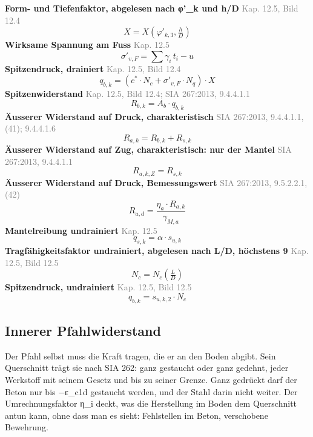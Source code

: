 \documentclass[11pt,a4paper]{article}
\newcommand{\normref}[1]{{\small\textcolor{gray}{#1}}}
\begin{document}
\noindent\textbf{Form- und Tiefenfaktor, abgelesen nach φ'\_k und h/D} \hfill \normref{Kap. 12.5, Bild 12.4}
\begin{equation*}
X = X\left(\varphi'_{k,3}, \tfrac{h}{D}\right)
\end{equation*}
\noindent\textbf{Wirksame Spannung am Fuss} \hfill \normref{Kap. 12.5}
\begin{equation*}
\sigma'_{v,F} = \sum \gamma_i \, t_i - u
\end{equation*}
\noindent\textbf{Spitzendruck, drainiert} \hfill \normref{Kap. 12.5, Bild 12.4}
\begin{equation*}
q_{b,k} = \left(c^{*} \cdot N_c + \sigma'_{v,F} \cdot N_q\right) \cdot X
\end{equation*}
\noindent\textbf{Spitzenwiderstand} \hfill \normref{Kap. 12.5, Bild 12.4; SIA 267:2013, 9.4.4.1.1}
\begin{equation*}
R_{b,k} = A_b \cdot q_{b,k}
\end{equation*}
\noindent\textbf{Äusserer Widerstand auf Druck, charakteristisch} \hfill \normref{SIA 267:2013, 9.4.4.1.1, (41); 9.4.4.1.6}
\begin{equation*}
R_{a,k} = R_{b,k} + R_{s,k}
\end{equation*}
\noindent\textbf{Äusserer Widerstand auf Zug, charakteristisch: nur der Mantel} \hfill \normref{SIA 267:2013, 9.4.4.1.1}
\begin{equation*}
R_{a,k,Z} = R_{s,k}
\end{equation*}
\noindent\textbf{Äusserer Widerstand auf Druck, Bemessungswert} \hfill \normref{SIA 267:2013, 9.5.2.2.1, (42)}
\begin{equation*}
R_{a,d} = \frac{\eta_a \cdot R_{a,k}}{\gamma_{M,a}}
\end{equation*}
\noindent\textbf{Mantelreibung undrainiert} \hfill \normref{Kap. 12.5}
\begin{equation*}
q_{s,k} = \alpha \cdot s_{u,k}
\end{equation*}
\noindent\textbf{Tragfähigkeitsfaktor undrainiert, abgelesen nach L/D, höchstens 9} \hfill \normref{Kap. 12.5, Bild 12.5}
\begin{equation*}
N_c = N_c\left(\tfrac{L}{D}\right)
\end{equation*}
\noindent\textbf{Spitzendruck, undrainiert} \hfill \normref{Kap. 12.5, Bild 12.5}
\begin{equation*}
q_{b,k} = s_{u,k,2} \cdot N_c
\end{equation*}
\subsection{Innerer Pfahlwiderstand}
Der Pfahl selbst muss die Kraft tragen, die er an den Boden abgibt. Sein Querschnitt trägt sie nach SIA 262: ganz gestaucht oder ganz gedehnt, jeder Werkstoff mit seinem Gesetz und bis zu seiner Grenze. Ganz gedrückt darf der Beton nur bis −ε\_c1d gestaucht werden, und der Stahl darin nicht weiter. Der Umrechnungsfaktor η\_i deckt, was die Herstellung im Boden dem Querschnitt antun kann, ohne dass man es sieht: Fehlstellen im Beton, verschobene Bewehrung.
\end{document}
